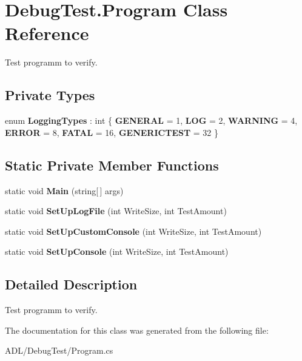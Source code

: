 \hypertarget{class_debug_test_1_1_program}{}\section{Debug\+Test.\+Program Class Reference}
\label{class_debug_test_1_1_program}


Test programm to verify.  


\subsection*{Private Types}
\begin{DoxyCompactItemize}
\item 
\mbox{\label{class_debug_test_1_1_program_a089211932d840b12e435553f833e5897}} 
enum {\bfseries Logging\+Types} \+: int \{ \newline
{\bfseries G\+E\+N\+E\+R\+AL} = 1, 
{\bfseries L\+OG} = 2, 
{\bfseries W\+A\+R\+N\+I\+NG} = 4, 
{\bfseries E\+R\+R\+OR} = 8, 
\newline
{\bfseries F\+A\+T\+AL} = 16, 
{\bfseries G\+E\+N\+E\+R\+I\+C\+T\+E\+ST} = 32
 \}
\end{DoxyCompactItemize}
\subsection*{Static Private Member Functions}
\begin{DoxyCompactItemize}
\item 
\mbox{\label{class_debug_test_1_1_program_aa61923e3897d53c6c33293c16016ad86}} 
static void {\bfseries Main} (string\mbox{[}$\,$\mbox{]} args)
\item 
\mbox{\label{class_debug_test_1_1_program_ac62a6336f3a9323c24330aff285922a2}} 
static void {\bfseries Set\+Up\+Log\+File} (int Write\+Size, int Test\+Amount)
\item 
\mbox{\label{class_debug_test_1_1_program_ad48f1fd9696f02152b71fdbf83a7c040}} 
static void {\bfseries Set\+Up\+Custom\+Console} (int Write\+Size, int Test\+Amount)
\item 
\mbox{\label{class_debug_test_1_1_program_afefa8176a3d5dd17f4d9e55636bb97b6}} 
static void {\bfseries Set\+Up\+Console} (int Write\+Size, int Test\+Amount)
\end{DoxyCompactItemize}


\subsection{Detailed Description}
Test programm to verify. 



The documentation for this class was generated from the following file\+:\begin{DoxyCompactItemize}
\item 
A\+D\+L/\+Debug\+Test/Program.\+cs\end{DoxyCompactItemize}
